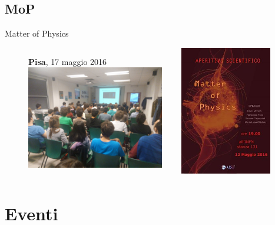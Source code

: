 \documentclass{Bredelebeamer}
\begin{document}
\subsection{MoP}
\begin{frame}{Matter of Physics}
\begin{figure}
\begin{columns}
\begin{column}{0.5\textwidth}
\vspace{1mm}
\centering 
\textbf{Pisa}, 17 maggio 2016 \\ \vspace{0.5cm}
\includegraphics[width=6cm]{images/MoP2.jpg}
\end{column}
\begin{column}{0.5\textwidth}\centering
\includegraphics[width=4cm]{images/MoP1.jpg}
\end{column}
\end{columns}
\end{figure}
\end{frame}


\section{Eventi}
\begin{frame}
\begin{block}{}
\end{block}
\end{frame} 
\end{document}
